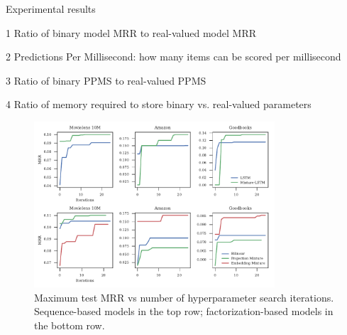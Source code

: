 \documentclass[sigconf]{acmart}
\begin{document}
\begin{table}[htbp]
\begin{threeparttable}
\caption{Experimental results}
\label{tb:results}

\begin{tablenotes}
\small{
\item[1] Ratio of binary model MRR to real-valued model MRR
\item[2] Predictions Per Millisecond: how many items can be scored per millisecond
\item[3] Ratio of binary PPMS to real-valued PPMS
\item[4] Ratio of memory required to store binary vs. real-valued parameters
}
\end{tablenotes}
\end{threeparttable}
\end{table}




\begin{figure}[h]
  \captionsetup{width=.8\linewidth}
  \caption{Maximum test MRR vs number of hyperparameter search iterations. Sequence-based models in the top row; factorization-based models in the bottom row.}
  \label{fig:hyper}
  \includegraphics[width=0.8\textwidth]{includes/hyperparam_search.pdf}
\end{figure}




\end{document}
